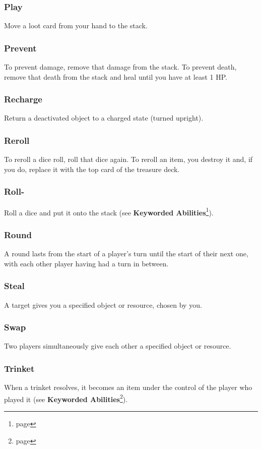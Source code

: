 \documentclass[10pt, a4paper, twoside]{article} %
\begin{document}
    \subsubsection*{Play}
    Move a loot card from your hand to the stack.
    \subsubsection*{Prevent}
    To prevent damage, remove that damage from the stack. To prevent death, remove that death from the stack and heal until you have at least 1 HP.
    \subsubsection*{Recharge}
    Return a deactivated object to a charged state (turned upright).
    \subsubsection*{Reroll}
    To reroll a dice roll, roll that dice again. To reroll an item, you destroy it and, if you do, replace it with the top card of the treasure deck.
    \subsubsection*{Roll-}
    Roll a dice and put it onto the stack (see \textbf{Keyworded Abilities}\footnote{page \pageref{keyworded}}).
    \subsubsection*{Round}
    A round lasts from the start of a player’s turn until the start of their next one, with each other player having had a turn in between.
    \subsubsection*{Steal}
    A target gives you a specified object or resource, chosen by you.
    \subsubsection*{Swap}
    Two players simultaneously give each other a specified object or resource.
    \subsubsection*{Trinket}
    When a trinket resolves, it becomes an item under the control of the player who played it (see \textbf{Keyworded Abilities}\footnote{page \pageref{keyworded}}).
\end{document}
